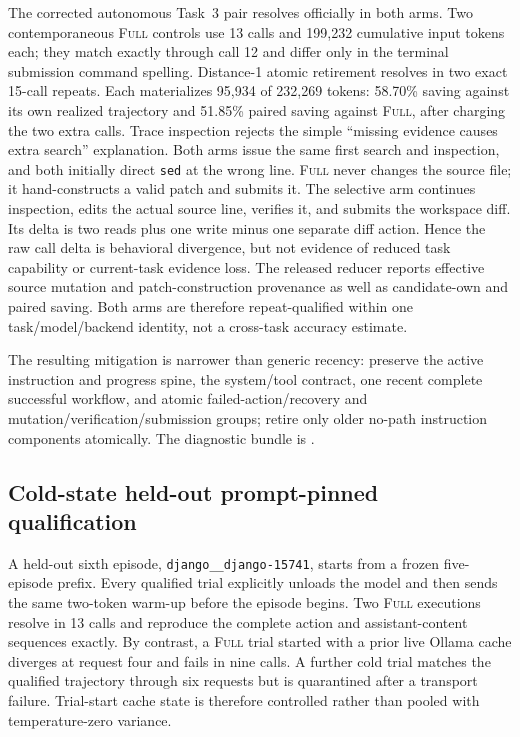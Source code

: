 \documentclass[11pt]{article}
\begin{document}
The corrected autonomous Task~3 pair resolves officially in both arms. Two
contemporaneous \textsc{Full} controls use 13 calls and 199,232 cumulative
input tokens each; they match exactly through call 12 and differ only in the
terminal submission command spelling. Distance-1 atomic retirement resolves in two exact 15-call
repeats. Each materializes 95,934 of 232,269 tokens: 58.70\% saving against its
own realized trajectory and 51.85\% paired saving against \textsc{Full}, after
charging the two extra calls. Trace inspection rejects the simple ``missing evidence causes extra
search'' explanation. Both arms issue the same first search and inspection,
and both initially direct \texttt{sed} at the wrong line. \textsc{Full} never
changes the source file; it hand-constructs a valid patch and submits it. The
selective arm continues inspection, edits the actual source line, verifies it,
and submits the workspace diff. Its delta is two reads plus one write minus
one separate diff action. Hence the raw call delta is behavioral divergence,
but not evidence of reduced task capability or current-task evidence loss.
The released reducer reports effective source mutation and patch-construction
provenance as well as candidate-own and paired saving. Both arms are therefore
repeat-qualified within one task/model/backend identity, not a cross-task
accuracy estimate.

The resulting mitigation is narrower than generic recency: preserve the
active instruction and progress spine, the system/tool contract, one recent
complete successful workflow, and atomic failed-action/recovery and
mutation/verification/submission groups; retire only older no-path instruction
components atomically.  The diagnostic bundle is
.

\subsection{Cold-state held-out prompt-pinned qualification}

A held-out sixth episode, \texttt{django\_\_django-15741}, starts from a frozen
five-episode prefix.  Every qualified trial explicitly unloads the model and
then sends the same two-token warm-up before the episode begins.  Two
\textsc{Full} executions resolve in 13 calls and reproduce the complete action
and assistant-content sequences exactly.  By contrast, a \textsc{Full} trial
started with a prior live Ollama cache diverges at request four and fails in
nine calls.  A further cold trial matches the qualified trajectory through six
requests but is quarantined after a transport failure.  Trial-start cache state
is therefore controlled rather than pooled with temperature-zero variance.
\end{document}
